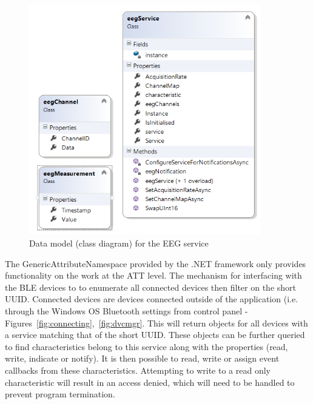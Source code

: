 \documentclass[]{article}
\begin{document}
\begin{figure}[htb]
	\begin{center}
		\includegraphics[width = 0.9\textwidth]{classdiagram}
	\end{center}
	\caption{Data model (class diagram) for the \ac{EEG} service}
	\label{fig:classdiagram}
\end{figure}

The GenericAttributeNamespace provided by the .NET framework only provides functionality on the work at the \ac{ATT} level. The mechanism for interfacing with the \ac{BLE} devices to to enumerate all connected devices then filter on the short \ac{UUID}. Connected devices are devices connected outside of the application (i.e. through the Windows OS Bluetooth settings from control panel - Figures~\ref{fig:connecting},~\ref{fig:dvcmgr}. This will return objects for all devices with a service matching that of the short \ac{UUID}. These objects can be further queried to find characteristics belong to this service along with the properties (read, write, indicate or notify). It is then possible to read, write or assign event callbacks from these characteristics. Attempting to write to a read only characteristic will result in an access denied, which will need to be handled to prevent program termination.  
\end{document}
